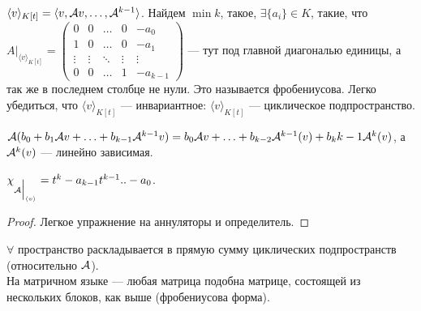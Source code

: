 \begin{statement}
    $\langle v \rangle_{K[t]} = \langle v, \mathcal{A} v, \ldots, \mathcal{A}^{k-1} \rangle$. Найдем $\min k$, такое, $\exists \{a_i\} \! \in K$, такие, что  $A\Big|_{\langle v\rangle_{K[t]}} = \begin{pmatrix} 0 & 0 & \ldots & 0 & -a_0 \\ 1 & 0 & \ldots & 0 & -a_1 \\ \vdots & \vdots & \ddots & \vdots & \vdots\\ 0 & 0 & \ldots & 1 & -a_{k-1} \end{pmatrix}$ --- тут под главной диагональю единицы, а так же в последнем столбце не нули. Это называется фробениусова. Легко убедиться, что $\langle v \rangle_{K[t]}$ --- инвариантное: 
    $\langle v\rangle_{K[t]}$ --- циклическое подпространство. 

    $\mathcal{A}(b_0 + b_1 \mathcal{A} v + \ldots + b_{k-1}\mathcal{A}^{k-1}v) = b_0\mathcal{A} v + \ldots + b_{k-2}\mathcal{A}^{k-1}(v) + b_k{k-1}\mathcal{A}^k(v)$, а $\mathcal{A}^{k}(v)$ --- линейно зависимая.  
\end{statement}
\begin{statement}
    $\chi_{\mathcal{A} \Big|_{\langle v \rangle}} = t^k - a_{k-1}t^{k-1} .. - a_0$.
\end{statement}
\begin{proof}
    Легкое упражнение на аннуляторы и определитель.
\end{proof}
\begin{statement}
    $\forall$ пространство раскладывается в прямую сумму циклических подпространств (относительно $\mathcal{A}$).\\ На матричном языке — любая матрица подобна матрице, состоящей из нескольких блоков, как выше (фробениусова форма).
\end{statement}
